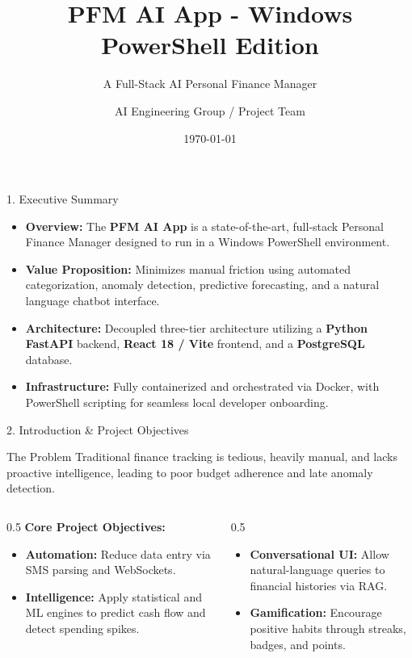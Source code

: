 \documentclass[10pt,aspectratio=169]{beamer}
\title[PFM AI App]{PFM AI App - Windows PowerShell Edition}
\subtitle{A Full-Stack AI Personal Finance Manager}
\author[Developer]{AI Engineering Group / Project Team}
\institute[Academic / Org]{Personal Finance Manager Project Presentation}
\date{\today}
\begin{document}
\begin{frame}[plain]
    \titlepage
\end{frame}

\begin{frame}{1. Executive Summary}
    \begin{itemize}
        \item \textbf{Overview:} The \textbf{PFM AI App} is a state-of-the-art, full-stack Personal Finance Manager designed to run in a Windows PowerShell environment.
        \item \textbf{Value Proposition:} Minimizes manual friction using automated categorization, anomaly detection, predictive forecasting, and a natural language chatbot interface.
        \item \textbf{Architecture:} Decoupled three-tier architecture utilizing a \textbf{Python FastAPI} backend, \textbf{React 18 / Vite} frontend, and a \textbf{PostgreSQL} database.
        \item \textbf{Infrastructure:} Fully containerized and orchestrated via Docker, with PowerShell scripting for seamless local developer onboarding.
    \end{itemize}
\end{frame}

\begin{frame}{2. Introduction \& Project Objectives}
    \begin{block}{The Problem}
        Traditional finance tracking is tedious, heavily manual, and lacks proactive intelligence, leading to poor budget adherence and late anomaly detection.
    \end{block}
    
    \begin{columns}[T]
        \begin{column}{0.5\textwidth}
            \textbf{Core Project Objectives:}
            \begin{itemize}
                \item \textbf{Automation:} Reduce data entry via SMS parsing and WebSockets.
                \item \textbf{Intelligence:} Apply statistical and ML engines to predict cash flow and detect spending spikes.
            \end{itemize}
        \end{column}
        \begin{column}{0.5\textwidth}
            \begin{itemize}
                \item \textbf{Conversational UI:} Allow natural-language queries to financial histories via RAG.
                \item \textbf{Gamification:} Encourage positive habits through streaks, badges, and points.
            \end{itemize}
        \end{column}
    \end{columns}
\end{frame}
\end{document}
